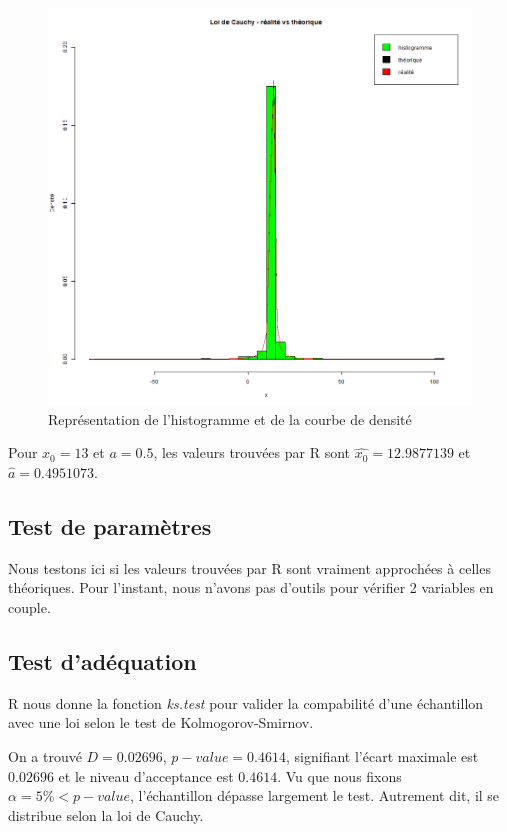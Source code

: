 \documentclass[12pt,a4paper,titlepage]{article}
\numberwithin{equation}{section}
\begin{document}
\begin{figure}[h]
\includegraphics[width=\linewidth]{images/Cauchy_real_vs_theo.png}
\caption{Représentation de l'histogramme et de la courbe de densité}
\end{figure}

Pour $x_0=13$ et $a=0.5$, les valeurs trouvées par R sont $\hat{x_0} = 12.9877139$ et $\hat{a} = 0.4951073$.

\subsection{Test de paramètres}

Nous testons ici si les valeurs trouvées par R sont vraiment approchées à celles théoriques. Pour l'instant, nous n'avons pas d'outils pour vérifier 2 variables en couple.

\subsection{Test d'adéquation}

R nous donne la fonction \emph{ks.test} pour valider la compabilité d'une échantillon avec une loi selon le test de Kolmogorov-Smirnov.



On a trouvé $D = 0.02696$, $p-value = 0.4614$, signifiant l'écart maximale est $0.02696$ et le niveau d'acceptance est $0.4614$. Vu que nous fixons $\alpha = 5\% < p-value$, l'échantillon dépasse largement le test. Autrement dit, il se distribue selon la loi de Cauchy.
\end{document}

